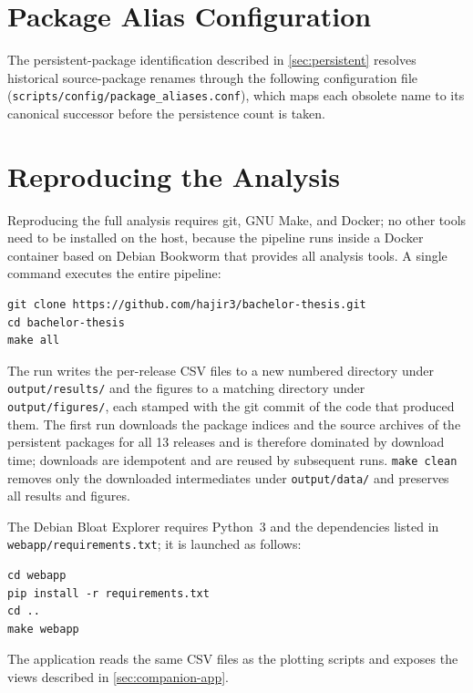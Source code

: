 \section{Package Alias Configuration}
\label{app:aliases}

The persistent-package identification described in \autoref{sec:persistent} resolves historical source-package renames through the following configuration file 
\newline (\texttt{scripts/config/package\_aliases.conf}), which maps each obsolete name to its canonical successor before the persistence count is taken.



\newpage

\section{Reproducing the Analysis}
\label{app:reproduction}

Reproducing the full analysis requires git, GNU Make, and Docker; no other tools need to be installed on the host, because the pipeline runs inside a Docker container based on Debian Bookworm that provides all analysis tools. A single command executes the entire pipeline:

\begin{lstlisting}
git clone https://github.com/hajir3/bachelor-thesis.git
cd bachelor-thesis
make all
\end{lstlisting}

The run writes the per-release CSV files to a new numbered directory under \newline \texttt{output/results/} and the figures to a matching directory under \texttt{output/figures/}, each stamped with the git commit of the code that produced them. The first run downloads the package indices and the source archives of the persistent packages for all 13 releases and is therefore dominated by download time; downloads are idempotent and are reused by subsequent runs. \texttt{make clean} removes only the downloaded intermediates under \texttt{output/data/} and preserves all results and figures.

The Debian Bloat Explorer requires Python~3 and the dependencies listed in \newline \texttt{webapp/requirements.txt}; it is launched as follows:

\begin{lstlisting}
cd webapp
pip install -r requirements.txt
cd ..
make webapp
\end{lstlisting}

The application reads the same CSV files as the plotting scripts and exposes the views described in \autoref{sec:companion-app}.
